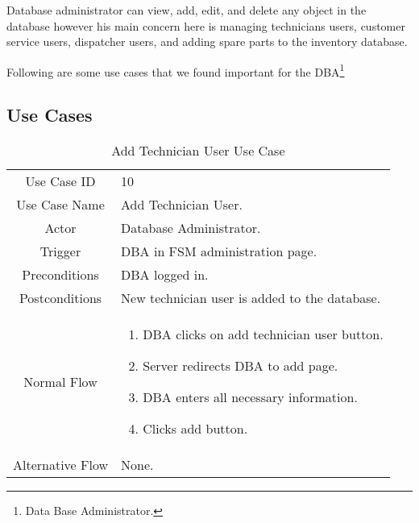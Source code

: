 Database administrator can view, add, edit, and delete any object in the database however his main concern here is managing technicians users, customer service users, dispatcher users, and adding spare parts to the inventory database.

Following are some use cases that we found important for the DBA\footnote{Data Base Administrator.}

\subsection{Use Cases}
	\begin{table}[H]
		\centering
		\renewcommand{\arraystretch}{1.5}
		\begin{tabular}[t]{ c  m{10cm} }
			Use Case ID & 10  \\
			Use Case Name & Add Technician User. \\
			Actor & Database Administrator. \\
			Trigger & DBA in FSM administration page. \\
			Preconditions & DBA logged in. \\
			Postconditions & New technician user is added to the database. \\
			Normal Flow &\begin{enumerate}
				\item DBA clicks on add technician user button.
				\item Server redirects DBA to add page.
				\item DBA enters all necessary information.
				\item Clicks add button.
			\end{enumerate}\\
			Alternative Flow & None. \\
		\end{tabular}
		\caption{Add Technician User Use Case}
		\renewcommand{\arraystretch}{1.0}
	\end{table}
	
